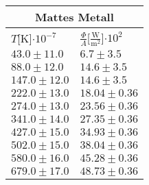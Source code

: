 \documentclass{article}
\begin{document}
\begin{tabular}{|p{3cm}|p{3cm}|}
\hline
\multicolumn{2}{|c|}{Mattes Metall}\\
\hline
$T$[K]$\cdot 10^{-7}$&$\frac{\Phi}{A}$[$\frac{\textrm{W}}{\textrm{m}^2}$]$\cdot 10^{2}$\\
\hline
$43.0\pm11.0$&$6.7\pm 3.5$\\
$88.0\pm12.0$&$14.6\pm 3.5$\\
$147.0\pm12.0$&$14.6\pm 3.5$\\
$222.0\pm13.0$&$18.04\pm 0.36$\\
$274.0\pm13.0$&$23.56\pm 0.36$\\
$341.0\pm14.0$&$27.35\pm 0.36$\\
$427.0\pm15.0$&$34.93\pm 0.36$\\
$502.0\pm15.0$&$38.04\pm 0.36$\\
$580.0\pm16.0$&$45.28\pm 0.36$\\
$679.0\pm17.0$&$48.73\pm 0.36$\\
\hline
\end{tabular}
\end{document}
